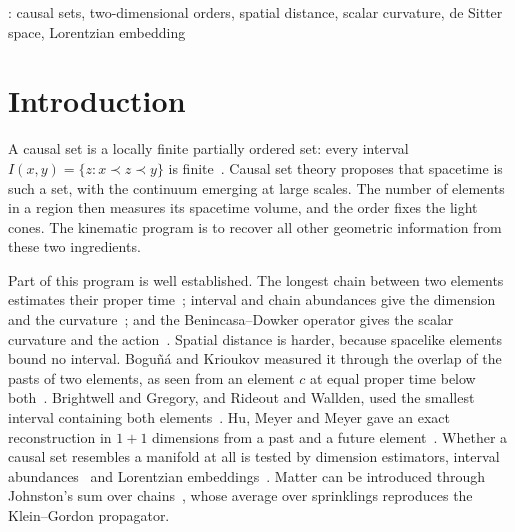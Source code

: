 \documentclass[12pt]{iopart}
\begin{document}
\vspace{2pc}
: causal sets, two-dimensional orders, spatial distance, scalar curvature, de Sitter space, Lorentzian embedding

\submitto{\CQG}

\maketitle

\section{Introduction}\label{sec:intro}
A causal set is a locally finite partially ordered set: every interval $I(x,y)=\{z:x\prec z\prec y\}$ is finite~\cite{BLMS87,Surya19}. Causal set theory proposes that spacetime is such a set, with the continuum emerging at large scales. The number of elements in a region then measures its spacetime volume, and the order fixes the light cones. The kinematic program is to recover all other geometric information from these two ingredients.

Part of this program is well established. The longest chain between two elements estimates their proper time~\cite{BrightwellGregory91}; interval and chain abundances give the dimension~\cite{Myrheim78,Meyer88} and the curvature~\cite{RSS13,GlaserSurya13}; and the Benincasa--Dowker operator gives the scalar curvature and the action~\cite{BD10,DowkerGlaser13}. Spatial distance is harder, because spacelike elements bound no interval. Bogu\~n\'a and Krioukov measured it through the overlap of the pasts of two elements, as seen from an element $c$ at equal proper time below both~\cite{BK24}. Brightwell and Gregory, and Rideout and Wallden, used the smallest interval containing both elements~\cite{BrightwellGregory91,RideoutWallden09}. Hu, Meyer and Meyer gave an exact reconstruction in $1+1$ dimensions from a past and a future element~\cite{HMM25}. Whether a causal set resembles a manifold at all is tested by dimension estimators, interval abundances~\cite{GlaserSurya13} and Lorentzian embeddings~\cite{CloughEvans16,Henson06,Johnston25}. Matter can be introduced through Johnston's sum over chains~\cite{Johnston08,Johnston09}, whose average over sprinklings reproduces the Klein--Gordon propagator.
\end{document}
